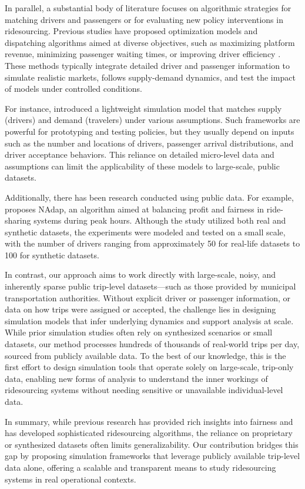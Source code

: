 In parallel, a substantial body of literature focuses on algorithmic strategies for matching drivers and passengers or for evaluating new policy interventions in ridesourcing. Previous studies have proposed optimization models and dispatching algorithms aimed at diverse objectives, such as maximizing platform revenue, minimizing passenger waiting times, or improving driver efficiency \cite{zhang2020pricing, schreieck2016matching, di2013optimization, cao2021optimization}. These methods typically integrate detailed driver and passenger information to simulate realistic markets, follows supply-demand dynamics, and test the impact of models under controlled conditions.

For instance, \cite{kucharski2022simulating} introduced a lightweight simulation model that matches supply (drivers) and demand (travelers) under various assumptions. Such frameworks are powerful for prototyping and testing policies, but they usually depend on inputs such as the number and locations of drivers, passenger arrival distributions, and driver acceptance behaviors. This reliance on detailed micro-level data and assumptions can limit the applicability of these models to large-scale, public datasets.

Additionally, there has been research conducted using public data. For example, \cite{nanda2020balancing} proposes NAdap, an algorithm aimed at balancing profit and fairness in ride-sharing systems during peak hours. Although the study utilized both real and synthetic datasets, the experiments were modeled and tested on a small scale, with the number of drivers ranging from approximately 50 for real-life datasets to 100 for synthetic datasets.

In contrast, our approach aims to work directly with large-scale, noisy, and inherently sparse public trip-level datasets—such as those provided by municipal transportation authorities. Without explicit driver or passenger information, or data on how trips were assigned or accepted, the challenge lies in designing simulation models that infer underlying dynamics and support analysis at scale. While prior simulation studies often rely on synthesized scenarios or small datasets, our method processes hundreds of thousands of real-world trips per day, sourced from publicly available data. To the best of our knowledge, this is the first effort to design simulation tools that operate solely on large-scale, trip-only data, enabling new forms of analysis to understand the inner workings of ridesourcing systems without needing sensitive or unavailable individual-level data.

In summary, while previous research has provided rich insights into fairness and has developed sophisticated ridesourcing algorithms, the reliance on proprietary or synthesized datasets often limits generalizability. Our contribution bridges this gap by proposing simulation frameworks that leverage publicly available trip-level data alone, offering a scalable and transparent means to study ridesourcing systems in real operational contexts.